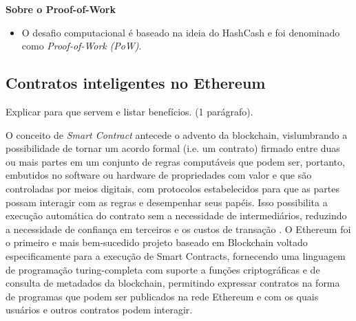 \documentclass[a4paper,11pt]{article}
\begin{document}
 \textbf{Sobre o Proof-of-Work}

\begin{itemize}
    \item O desafio computacional é baseado na ideia do HashCash \cite{Back2002} e foi denominado como \emph{Proof-of-Work} \emph{(PoW)}.
\end{itemize}
\subsection{Contratos inteligentes no Ethereum} \label{sec:sub:contratos-ethereum}

{\color{ForestGreen}Explicar para que servem e listar benefícios. (1 parágrafo).}

O conceito de \emph{Smart Contract} antecede o advento da blockchain, vislumbrando a possibilidade  de tornar um acordo formal (i.e. um contrato) firmado entre duas ou mais partes em um conjunto de regras computáveis que podem ser, portanto, embutidos no software ou hardware de propriedades com valor e que são controladas por meios digitais, com protocolos estabelecidos para que as partes possam interagir com as regras e desempenhar seus papéis.
Isso possibilita a execução automática do contrato sem a necessidade de intermediários, reduzindo a necessidade de confiança em terceiros e os custos de transação \cite{Bartoletti2019, Szabo1996}.
O Ethereum foi o primeiro e mais bem-sucedido projeto baseado em Blockchain voltado especificamente para a execução de Smart Contracts, fornecendo uma linguagem de programação turing-completa com suporte a funções criptográficas e de consulta de metadados da blockchain, permitindo expressar contratos na forma de programas que podem ser publicados na rede Ethereum e com os quais usuários e outros contratos podem interagir.
\end{document}

